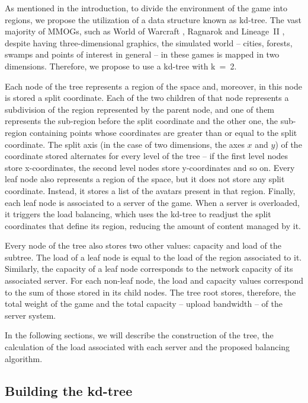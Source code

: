 \documentclass[acmjacm]{acmtrans2m}
\begin{document}
As mentioned in the introduction, to divide the environment of the game into regions, we propose the utilization of a data structure known as kd-tree. The vast majority of MMOGs, such as World of Warcraft \cite{worldofwarcraft}, Ragnarok \cite{ragnarok} and \mbox{Lineage II} \cite{lineage2}, despite having three-dimensional graphics, the simulated world -- cities, forests, swamps and points of interest in general -- in these games is mapped in two dimensions. Therefore, we propose to use a kd-tree with \mbox{k = 2}.

Each node of the tree represents a region of the space and, moreover, in this node is stored a split coordinate. Each of the two children of that node represents a subdivision of the region represented by the parent node, and one of them represents the sub-region before the split coordinate and the other one, the sub-region containing points whose coordinates are greater than or equal to the split coordinate. The split axis (in the case of two dimensions, the axes $x$ and $y$) of the coordinate stored alternates for every level of the tree -- if the first level nodes store x-coordinates, the second level nodes store y-coordinates and so on. Every leaf node also represents a region of the space, but it does not store any split coordinate. Instead, it stores a list of the avatars present in that region. Finally, each leaf node is associated to a server of the game. When a server is overloaded, it triggers the load balancing, which uses the kd-tree to readjust the split coordinates that define its region, reducing the amount of content managed by it.

Every node of the tree also stores two other values: capacity and load of the subtree. The load of a leaf node is equal to the load of the region associated to it. Similarly, the capacity of a leaf node corresponds to the network capacity of its associated server. For each non-leaf node, the load and capacity values correspond to the sum of those stored in its child nodes. The tree root stores, therefore, the total weight of the game and the total capacity -- upload bandwidth -- of the server system.

In the following sections, we will describe the construction of the tree, the calculation of the load associated with each server and the proposed balancing algorithm.

\subsection{Building the kd-tree}
\end{document}

